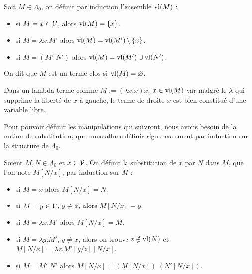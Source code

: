 \begin{defi}
    Soit $M\in\Lambda_0$, on définit par induction l'ensemble $\mathrm{vl}(M)$ :
    \begin{itemize}[label=$\bullet$]
        \item si $M = x \in \mathcal V$, alors $\mathrm{vl}(M) = \{x\}$.
        \item si $M = \lambda x.M'$ alors $\mathrm{vl}(M) = \mathrm{vl}(M')\setminus \{x\}$.
        \item si $M = (M'\;N')$ alors $\mathrm{vl}(M) = \mathrm{vl}(M')\cup \mathrm{vl}(N')$.
    \end{itemize}

    On dit que $M$ est un terme clos si $\mathrm{vl}(M) = \varnothing$.
\end{defi}

\begin{rmk}
    Dans un lambda-terme comme $M := (\lambda x.x)x$, $x\in\mathrm{vl}(M)$ var malgré le $\lambda$ qui supprime la liberté de $x$ à gauche, le terme de droite $x$ est bien constitué d'une variable libre.
\end{rmk}

Pour pouvoir définir les manipulations qui suivront, nous avons besoin de la notion de substitution, que nous allons définir rigoureusement par induction sur la structure de $\Lambda_0$.

\begin{defi}[Substitution]
    Soient $M,N\in\Lambda_0$ et $x\in\mathcal V$. On définit la substitution de $x$ par $N$ dans $M$, que l'on note $M[N/x]$, par induction sur $M$ :
    \begin{itemize}[label=$\bullet$]
        \item si $M = x$ alors $M[N/x] = N$.
        \item si $M = y\in\mathcal V$, $y\neq x$, alors $M[N/x] = y$.
        \item si $M = \lambda x.M'$ alors $M[N/x] = M$.
        \item si $M = \lambda y.M'$, $y\neq x$, alors on trouve $z\notin\mathrm{vl}(N)$ et $M[N/x] = \lambda z. M'[y/z][N/x]$.
        \item si $M = M'\;N'$ alors $M[N/x] = (M[N/x])\;(N'[N/x])$.
    \end{itemize}
\end{defi}


